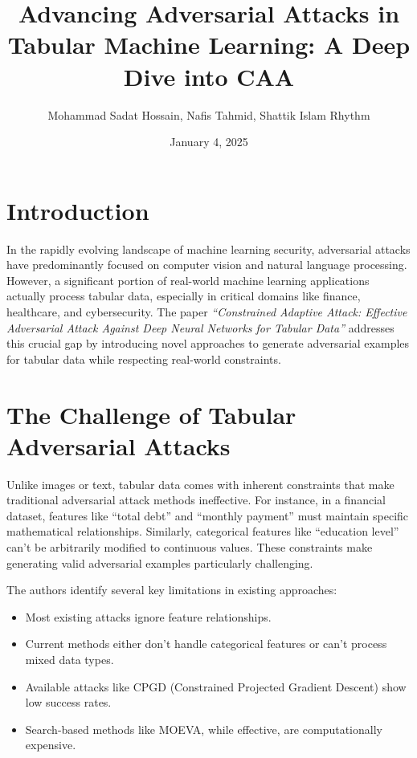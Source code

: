 \documentclass{article}
\title{Advancing Adversarial Attacks in Tabular Machine Learning: A Deep Dive into CAA}
\author{Mohammad Sadat Hossain, Nafis Tahmid, Shattik Islam Rhythm}
\date{January 4, 2025}
\begin{document}
\maketitle

\section*{Introduction}

In the rapidly evolving landscape of machine learning security, adversarial attacks have predominantly focused on computer vision and natural language processing. However, a significant portion of real-world machine learning applications actually process tabular data, especially in critical domains like finance, healthcare, and cybersecurity. The paper \textit{``Constrained Adaptive Attack: Effective Adversarial Attack Against Deep Neural Networks for Tabular Data''} addresses this crucial gap by introducing novel approaches to generate adversarial examples for tabular data while respecting real-world constraints.

\section*{The Challenge of Tabular Adversarial Attacks}

Unlike images or text, tabular data comes with inherent constraints that make traditional adversarial attack methods ineffective. For instance, in a financial dataset, features like ``total debt'' and ``monthly payment'' must maintain specific mathematical relationships. Similarly, categorical features like ``education level'' can't be arbitrarily modified to continuous values. These constraints make generating valid adversarial examples particularly challenging.

The authors identify several key limitations in existing approaches:
\begin{itemize}
    \item Most existing attacks ignore feature relationships.
    \item Current methods either don't handle categorical features or can't process mixed data types.
    \item Available attacks like CPGD (Constrained Projected Gradient Descent) show low success rates.
    \item Search-based methods like MOEVA, while effective, are computationally expensive.
\end{itemize}
\end{document}
